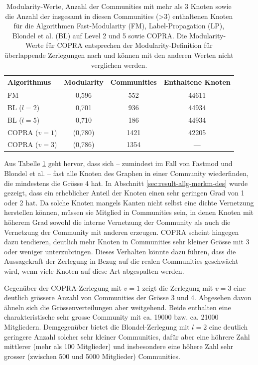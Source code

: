 \begin{table}[t]
  \centering
  \footnotesize
  \begin{tabular}{l|c|c|c}
    Algorithmus & Modularity & Communities &
    Enthaltene Knoten \\
    \hline
    FM & 0,596 & 552 & 44611 \\
    \hline
    BL ($l=2$)& 0,701 & 936 & 44934 \\
    BL ($l=5$)& 0,710 & 186 & 44934 \\
    \hline
    COPRA ($v=1$) & (0,780) & 1421 & 42205 \\
    COPRA ($v=3$) & (0,786) & 1354 & --- \\

  \end{tabular}
  \caption{Modularity-Werte, Anzahl der Communities mit mehr als 3
    Knoten sowie die Anzahl der insgesamt in diesen Communities (>3) enthaltenen
    Knoten 
    f\"ur die Algorithmen Fast-Modularity (FM), Label-Propagation
    (LP), Blondel et al. (BL) auf Level 2 und 5 sowie COPRA. Die
    Modularity-Werte f\"ur COPRA entsprechen der Modularity-Definition
    f\"ur \"uberlappende Zerlegungen nach \cite{Nicosia2009} und k\"onnen mit den anderen
    Werten nicht verglichen werden.}
  \label{tab:mod-result}
\end{table}

Aus Tabelle \ref{tab:mod-result} geht hervor, dass sich -- zumindest
im Fall von Fastmod und Blondel et al. -- fast alle Knoten des Graphen
in einer Community wiederfinden, die mindestens die Gr\"osse 4 hat. In
Abschnitt \ref{sec:result-allg-merkm-des} wurde gezeigt, dass ein
erheblicher Anteil der Knoten einen sehr geringen Grad von 1 oder 2
hat. Da solche Knoten mangels Kanten nicht selbst eine dichte
Vernetzung herstellen k\"onnen, m\"ussen sie Mitglied in Communities
sein, in denen Knoten mit h\"oherem Grad sowohl die interne Vernetzung
der Community als auch die Vernetzung der Community mit anderen
erzeugen. COPRA scheint hingegen dazu tendieren, deutlich mehr Knoten
in Communities sehr kleiner Gr\"osse mit 3 oder weniger
unterzubringen. Dieses Verhalten k\"onnte dazu f\"uhren, dass die
Aussagekraft der Zerlegung in Bezug auf die realen Communities
geschw\"acht wird, wenn viele Knoten auf diese Art abgespalten werden.

Gegen\"uber der COPRA-Zerlegung mit $v=1$ zeigt die Zerlegung mit
$v=3$ eine deutlich gr\"ossere Anzahl von Communities der Gr\"osse 3
und 4. Abgesehen davon \"ahneln sich die Gr\"ossenverteilungen aber
weitgehend. Beide enthalten eine charakteristische sehr grosse
Community mit ca. 19000 bzw. ca. 21000 Mitgliedern. Demgegen\"uber
bietet die Blondel-Zerlegung mit $l=2$ eine deutlich geringere Anzahl
solcher sehr kleiner Communities, daf\"ur aber eine h\"ohrere Zahl
mittlerer (mehr als 100 Mitglieder) und insbesondere eine h\"ohere
Zahl sehr grosser (zwischen 500 und 5000 Mitglieder) Communities.

